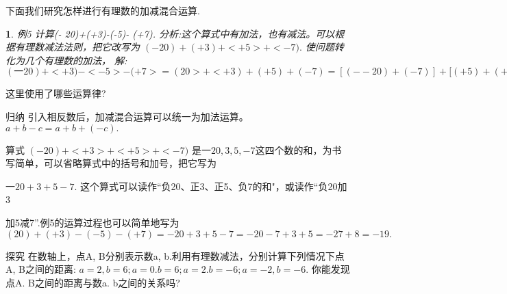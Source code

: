 \documentclass[UTF8]{article}
\newtheorem{example}{ }
\begin{document}
下面我们研究怎样进行有理数的加减混合运算.

\begin{example}
例5 计算(- 20)+(+3)-(-5)- (+7).
分析:这个算式中有加法，也有减法。可以根据有理数减法法则，把它改写为
	$(- 20)+(+3)+<+5>+<-7). $
使问题转化为几个有理数的加法，
解:  $(一20)+<+3)-<-5>-(+7>
	= ( 20>+<+3)+(+5)+(- 7)
	=[(- -20)+(-7)]+[(+5)+(+3>]=(-27)+<+8)= -19.$
\end{example}
这里使用了哪些运算律?

归纳
引入相反数后，加减混合运算可以统一为加法运算。
	$a+b-c=a+b+(-c).$	

算式
	$(- 20)+<+3>+<+5>+<-7)$
是$一20, 3, 5, -7$这四个数的和，为书写简单，可以省略算式中的括号和加号，把它写为

	$一20+3+5-7.$
这个算式可以读作“负20、正3、正5、负7的和"，或读作“负20加3

加5减7”.例5的运算过程也可以简单地写为
	$( 20)+(+3)-(-5)- (+7)
	= - 20+3+5-7
	=-20-7+3+5
	=-27+8
	=- 19.$

探究
在数轴上，点A, B分别表示数a, b.利用有理数减法，分别计算下列情况下点A, B之间的距离:
	$a=2, b=6; a=0. b=6; a=2. b=-6; a=-2, b=-6.$
你能发现点A. B之间的距离与数a. b之间的关系吗?
\end{document}
